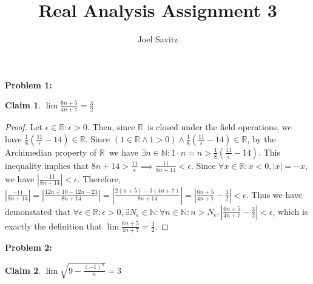 \documentclass{article}
\title{Real Analysis Assignment 3}
\author{Joel Savitz}
\newcommand{\reals}{\ensuremath{\mathbb{R}}}
\newcommand{\nats}{\ensuremath{\mathbb{N}}}
\newcommand{\eps}{\ensuremath{\epsilon}}
\newcommand{\neps}{\ensuremath{N_\epsilon}}
\newtheorem{clm}{Claim}
\begin{document}
\maketitle

\textbf{Problem 1:}

\begin{clm} \label{c1}
	$\lim \frac{6n+5}{4n+7} = \frac{3}{2}$
\end{clm}

\begin{proof}
	Let $\eps \in \reals : \eps > 0$.
	Then, since \reals\ is closed under the field operations,
	we have $\frac{1}{8}(\frac{11}{\eps} - 14) \in \reals$.
	Since $(1 \in \reals \land 1 > 0) \land \frac{1}{8}(\frac{11}{\eps} - 14) \in \reals$,
	by the Archimedian property of \reals\,
	we have $\exists n \in \nats: 1 \cdot n = n > \frac{1}{8}(\frac{11}{\eps} - 14)$.
	This inequality implies that $8n + 14 > \frac{11}{\eps} \implies \frac{11}{8n+14} < \eps$.
	Since $\forall x \in \reals: x < 0, |x| = -x$, we have $|\frac{-11}{8n+14}| < \eps$.
	Therefore, $ |\frac{-11}{8n+14}| = |\frac{12n + 10 - 12n - 21}{8n+14}| = |\frac{2(n+5) - 3(4n+7)}{8n+14}| =
	|\frac{6n+5}{4n+7} - \frac{3}{2}| < \eps$.
	Thus we have demonstated that $\forall \eps \in \reals : \eps > 0, \exists \neps \in \nats:
	\forall n \in \nats: n > \neps, |\frac{6n+5}{4n+7} - \frac{3}{2}| < \eps$,
	which is exactly the definition that
	$\lim \frac{6n+5}{4n+7} = \frac{3}{2}$.
\end{proof}

\textbf{Problem 2:}

\begin{clm} \label{c2}
	$\lim \sqrt{9-\frac{(-1)^n}{n}} = 3$
\end{clm}
\end{document}
